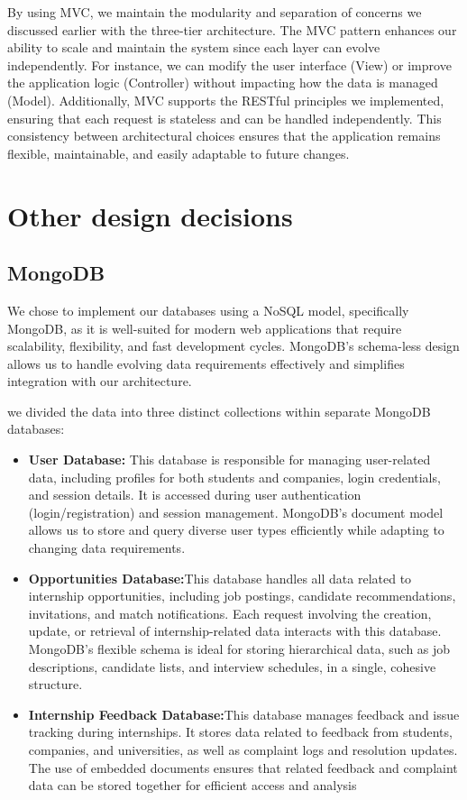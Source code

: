 By using MVC, we maintain the modularity and separation of concerns we discussed earlier with the three-tier architecture. The MVC pattern enhances our ability to scale and maintain the system since each layer can evolve independently. For instance, we can modify the user interface (View) or improve the application logic (Controller) without impacting how the data is managed (Model). Additionally, MVC supports the RESTful principles we implemented, ensuring that each request is stateless and can be handled independently. This consistency between architectural choices ensures that the application remains flexible, maintainable, and easily adaptable to future changes.

\section{Other design decisions }
\subsection{MongoDB}

We chose to implement our databases using a NoSQL model, specifically MongoDB, as it is well-suited for modern web applications that require scalability, flexibility, and fast development cycles. MongoDB’s schema-less design allows us to handle evolving data requirements effectively and simplifies integration with our architecture.

 we divided the data into three distinct collections within separate MongoDB databases:

\begin{itemize}
    \item \textbf{User Database:} This database is responsible for managing user-related data, including profiles for both students and companies, login credentials, and session details. It is accessed during user authentication (login/registration) and session management. MongoDB’s document model allows us to store and query diverse user types efficiently while adapting to changing data requirements.
    \item \textbf{Opportunities Database:}This database handles all data related to internship opportunities, including job postings, candidate recommendations, invitations, and match notifications. Each request involving the creation, update, or retrieval of internship-related data interacts with this database. MongoDB’s flexible schema is ideal for storing hierarchical data, such as job descriptions, candidate lists, and interview schedules, in a single, cohesive structure.
    \item \textbf{Internship Feedback Database:}This database manages feedback and issue tracking during internships. It stores data related to feedback from students, companies, and universities, as well as complaint logs and resolution updates. The use of embedded documents ensures that related feedback and complaint data can be stored together for efficient access and analysis
\end{itemize}

